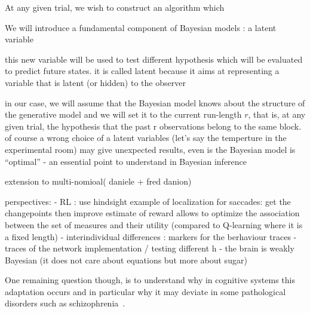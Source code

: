 \documentclass[12pt,english]{article}%
\newcommand{\citep}[1]{\parencite{#1}}
\begin{document}
At any given trial, we wish to construct an algorithm which

We will introduce a fundamental component of Bayesian models : a latent variable

this new variable will be used to test different hypothesis which will be evaluated to predict future states. it is called latent because it aims at representing a variable that is latent (or hidden) to the observer

in our case, we will assume that the Bayesian model knows about the structure of the generative model and we will set it to the current run-length $r$, that is, at any given trial, the hypothesis that the past r observations belong to the same block. of course a wrong choice of a latent variables (let's say the temperture in the experimental room) may give unexpected results, even is the Bayesian model is ``optimal'' - an essential point to understand in Bayesian inference

extension to multi-nomioal( daniele + fred danion)





perspectives:
- RL : use hindsight example of localization for saccades: get the changepoints then improve estimate of reward allows to optimize the association between the set of measures and their utility (compared to Q-learning where it is a fixed length)
- interindividual differences : markers for the berhaviour traces - traces of the network implementation / testing different h
- the brain is weakly Bayesian (it does not care about equations but more about sugar)


One remaining question though, is to understand why in cognitive systems
this adaptation occurs and
in particular why it may deviate
in some pathological disorders such as schizophrenia~\citep{Adams12}.
\end{document}
